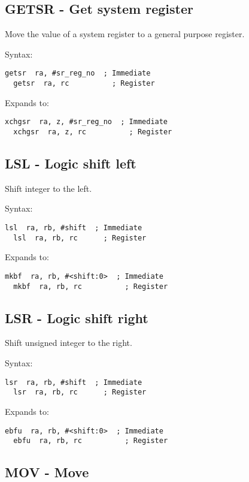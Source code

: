 \subsection{GETSR - Get system register}
\label{insn:GETSR}

Move the value of a system register to a general purpose register.

Syntax:
\begin{lstlisting}[style=assembler]
  getsr  ra, #sr_reg_no  ; Immediate
  getsr  ra, rc          ; Register
\end{lstlisting}

Expands to:
\begin{lstlisting}[style=assembler]
  xchgsr  ra, z, #sr_reg_no  ; Immediate
  xchgsr  ra, z, rc          ; Register
\end{lstlisting}

\subsection{LSL - Logic shift left}
\label{insn:LSL}

Shift integer to the left.

Syntax:
\begin{lstlisting}[style=assembler]
  lsl  ra, rb, #shift  ; Immediate
  lsl  ra, rb, rc      ; Register
\end{lstlisting}

Expands to:
\begin{lstlisting}[style=assembler]
  mkbf  ra, rb, #<shift:0>  ; Immediate
  mkbf  ra, rb, rc          ; Register
\end{lstlisting}

\subsection{LSR - Logic shift right}
\label{insn:LSR}

Shift unsigned integer to the right.

Syntax:
\begin{lstlisting}[style=assembler]
  lsr  ra, rb, #shift  ; Immediate
  lsr  ra, rb, rc      ; Register
\end{lstlisting}

Expands to:
\begin{lstlisting}[style=assembler]
  ebfu  ra, rb, #<shift:0>  ; Immediate
  ebfu  ra, rb, rc          ; Register
\end{lstlisting}

\subsection{MOV - Move}
\label{insn:MOV}

